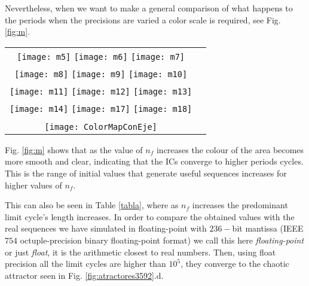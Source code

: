 Nevertheless, when we want to make a general comparison of what happens to the periods when the precisions are varied a color scale is required, see Fig. \ref{fig:m}.
%
\begin{figure*}
\centering
\begin{tabular}{cc}
\texttt{[image: m5]}
\texttt{[image: m6]}
\texttt{[image: m7]}\\
\texttt{[image: m8]}
\texttt{[image: m9]}
\texttt{[image: m10]}\\
\texttt{[image: m11]}
\texttt{[image: m12]}
\texttt{[image: m13]}\\
\texttt{[image: m14]}
\texttt{[image: m17]}
\texttt{[image: m18]}\\
\\   
\texttt{[image: ColorMapConEje]}
\end{tabular}
\caption{Period's lengths evolution of the attraction domains for: (a) $n_f=5$, (b) $n_f=6$, (c) $n_f=7$, (d) $n_f=8$, (e) $n_f=9$, (f) $n_f=10$, (g) $n_f=11$, (h) $n_f=12$, (i) $n_f=13$, (j) $n_f=14$, (k) $n_f=17$, (l) $n_f=18$.}
\label{fig:m}
\end{figure*}

Fig. \ref{fig:m} shows that as the value of $n_f$ increases the colour of the area becomes more smooth and clear, indicating that the ICs converge to higher periods cycles. This is the range of initial values that generate useful sequences increases for higher values of $n_f$.

This can also be seen in Table \ref{tabla}, where as $n_f$ increases the predominant limit cycle's length increases.
In order to compare the obtained values with the real sequences we have simulated in floating-point with $236-$bit mantissa (IEEE $754$ octuple-precision binary floating-point format) we call this here \textit{floating-point} or just \textit{float}, it is the arithmetic closest to real numbers.
Then, using float precision all the limit cycles are higher than $10^5$, they converge to the chaotic attractor seen in Fig. \ref{fig:atractores3592}.d.

